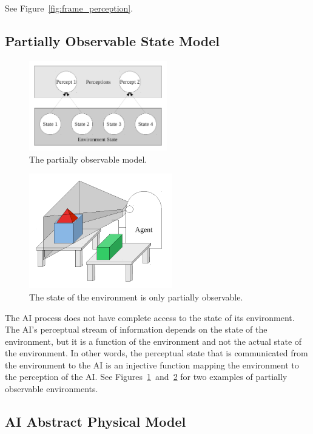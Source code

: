 See Figure~\ref{fig:frame_perception}.


\subsection{Partially Observable State Model}

\begin{figure}[bth]
  \center
  \includegraphics[width=6cm]{gfx/partially_observable}
  \caption[The partially observable state model]{The partially observable model.}
  \label{fig:partially_observable}
\end{figure}

\begin{figure}[bth]
  \center
  \includegraphics[height=5cm]{gfx/partial_frame_perception}
  \caption[The state of the environment is only partially
    observable]{The state of the environment is only partially
    observable.}
  \label{fig:partial_frame_perception}
\end{figure}

The AI process does not have complete access to the state of its
environment.  The AI's perceptual stream of information depends on
the state of the environment, but it is a function of the environment
and not the actual state of the environment.  In other words, the
perceptual state that is communicated from the environment to the
AI is an injective function mapping the environment to the
perception of the AI.  See
Figures~\ref{fig:partially_observable}~and~\ref{fig:partial_frame_perception}
for two examples of partially observable environments.


\subsection{AI Abstract Physical Model}

